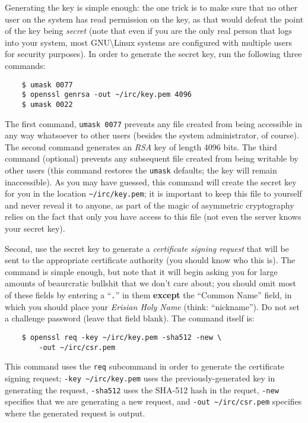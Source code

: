 \documentclass{article}
\begin{document}
{Generating the key is simple enough: the one trick is to make sure that no other user on the system has read permission on the key, as that would defeat the point of the key being \textit{secret} (note that even if you are the only real person that logs into your system, most GNU\textbackslash Linux systems are configured with multiple users for security purposes).  In order to generate the secret key, run the following three commands:
\begin{lstlisting}
    $ umask 0077
    $ openssl genrsa -out ~/irc/key.pem 4096
    $ umask 0022
\end{lstlisting}
The first command, \texttt{umask 0077} prevents any file created from being accessible in any way whatsoever to other users (besides the system administrator, of course).  The second command generates an \textit{RSA} key of length 4096 bits.  The third command (optional) prevents any subsequent file created from being writable by other users (this command restores the \texttt{umask} defaults; the key will remain inaccessible).  As you may have guessed, this command will create the secret key for you in the location \texttt{\textasciitilde/irc/key.pem}; it is important to keep this file to yourself and never reveal it to anyone, as part of the magic of asymmetric cryptography relies on the fact that only you have access to this file (not even the server knows your secret key).

Second, use the secret key to generate a \textit{certificate signing request} that will be sent to the appropriate certificate authority (you should know who this is).  The command is simple enough, but note that it will begin asking you for large amounts of beaurcratic bullshit that we don't care about; you should omit most of these fields by entering a ``\texttt{.}'' in them \textbf{except} the ``Common Name'' field, in which you should place your \textit{Erisian Holy Name} (think: ``nickname'').  Do not set a challenge password (leave that field blank).  The command itself is:
\begin{lstlisting}
    $ openssl req -key ~/irc/key.pem -sha512 -new \
        -out ~/irc/csr.pem
\end{lstlisting}
This command uses the \texttt{req} subcommand in order to generate the certificate signing request; \texttt{-key \textasciitilde/irc/key.pem} uses the previously-generated key in generating the request, \texttt{-sha512} uses the SHA-512 hash in the requet, \texttt{-new} specifies that we are generating a new request, and \texttt{-out \textasciitilde/irc/csr.pem} specifies where the generated request is output.

}
\end{document}
